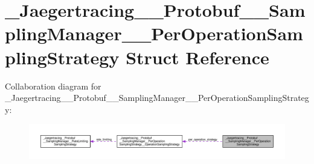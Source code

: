 \hypertarget{struct__Jaegertracing____Protobuf____SamplingManager____PerOperationSamplingStrategy}{}\section{\+\_\+\+Jaegertracing\+\_\+\+\_\+\+Protobuf\+\_\+\+\_\+\+Sampling\+Manager\+\_\+\+\_\+\+Per\+Operation\+Sampling\+Strategy Struct Reference}
\label{struct__Jaegertracing____Protobuf____SamplingManager____PerOperationSamplingStrategy}


Collaboration diagram for \+\_\+\+Jaegertracing\+\_\+\+\_\+\+Protobuf\+\_\+\+\_\+\+Sampling\+Manager\+\_\+\+\_\+\+Per\+Operation\+Sampling\+Strategy\+:
\nopagebreak
\begin{figure}[H]
\begin{center}
\leavevmode
\includegraphics[width=350pt]{struct__Jaegertracing____Protobuf____SamplingManager____PerOperationSamplingStrategy__coll__graph}
\end{center}
\end{figure}
